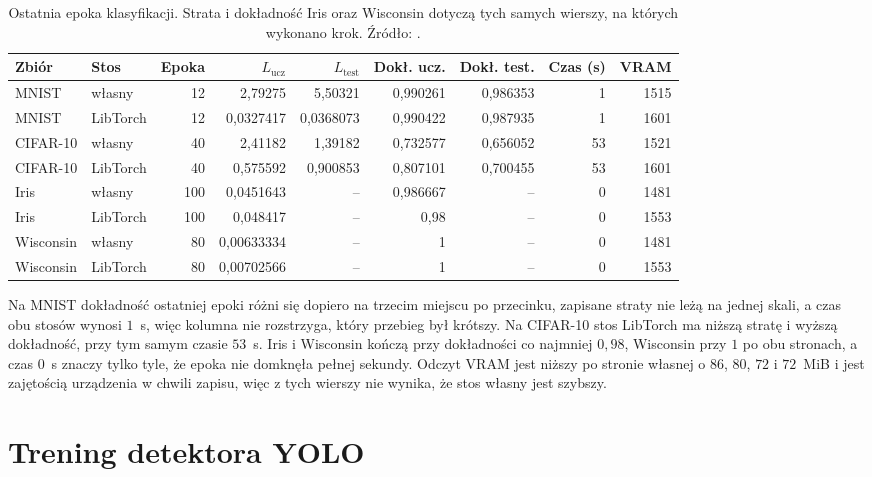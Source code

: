 \begin{table}[ht]
\centering
\caption{Ostatnia epoka klasyfikacji. Strata i dokładność Iris oraz Wisconsin dotyczą tych samych wierszy, na których wykonano krok. Źródło: .}
\label{tab:klasyfikacja}
\small
\begin{tabular}{llrrrrrrr}
\toprule
Zbiór & Stos & Epoka & $L_{\mathrm{ucz}}$ & $L_{\mathrm{test}}$ & Dokł. ucz. & Dokł. test. & Czas (s) & VRAM \\
\midrule
MNIST & własny & 12 & 2{,}79275 & 5{,}50321 & 0{,}990261 & 0{,}986353 & 1 & 1515 \\
MNIST & LibTorch & 12 & 0{,}0327417 & 0{,}0368073 & 0{,}990422 & 0{,}987935 & 1 & 1601 \\
\midrule
CIFAR-10 & własny & 40 & 2{,}41182 & 1{,}39182 & 0{,}732577 & 0{,}656052 & 53 & 1521 \\
CIFAR-10 & LibTorch & 40 & 0{,}575592 & 0{,}900853 & 0{,}807101 & 0{,}700455 & 53 & 1601 \\
\midrule
Iris & własny & 100 & 0{,}0451643 & -- & 0{,}986667 & -- & 0 & 1481 \\
Iris & LibTorch & 100 & 0{,}048417 & -- & 0{,}98 & -- & 0 & 1553 \\
\midrule
Wisconsin & własny & 80 & 0{,}00633334 & -- & 1 & -- & 0 & 1481 \\
Wisconsin & LibTorch & 80 & 0{,}00702566 & -- & 1 & -- & 0 & 1553 \\
\bottomrule
\end{tabular}
\end{table}

Na MNIST dokładność ostatniej epoki różni się dopiero na trzecim miejscu po przecinku, zapisane straty nie leżą na jednej skali, a czas obu stosów wynosi \(1\)~s, więc kolumna nie rozstrzyga, który przebieg był krótszy. Na CIFAR-10 stos LibTorch ma niższą stratę i wyższą dokładność, przy tym samym czasie \(53\)~s. Iris i Wisconsin kończą przy dokładności co najmniej \(0{,}98\), Wisconsin przy \(1\) po obu stronach, a czas \(0\)~s znaczy tylko tyle, że epoka nie domknęła pełnej sekundy. Odczyt VRAM jest niższy po stronie własnej o \(86\), \(80\), \(72\) i \(72\)~MiB i jest zajętością urządzenia w chwili zapisu, więc z tych wierszy nie wynika, że stos własny jest szybszy.

\section{Trening detektora YOLO}

